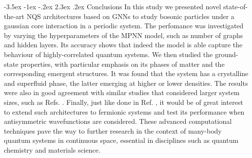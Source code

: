 \documentclass[a4paper, 12pt, oneside]{article}
\makeatletter
\renewcommand{\section}{\@startsection{section}{1}{\z@}%
             {-3.5ex \@plus-1ex \@minus-.2ex}%
             {2.3ex \@plus.2ex}%
             {\normalfont\large\bfseries}}
\makeatother
\begin{document}
\section{Conclusions}
In this study we presented novel state-of-the-art NQS architectures based on GNNs to study 
bosonic particles under a gaussian core interaction in a periodic system. The perfomance was 
investigated by varying the hyperparameters of the MPNN model, such as number of graphs and hidden 
layers. Its accuracy shows that indeed the model is able capture the behaviour of highly-correlated 
quantum systems. We then studied the ground-state properties, with particular 
emphasis on its phases of matter and the corresponding emergent structures. It was found that the system 
has a crystalline and superfluid phase, the latter emerging at higher or lower densities. 
The results were also in good agreement with similar studies that considered larger system sizes, 
such as Refs. \cite{pescia_2022, kroiss_2016}. Finally, just like done in Ref. \cite{pescia_2023}, it would be of 
great interest to extend such architectures to fermionic systems and test its performance when 
antisymmetric wavefunctions are considered. 
These advanced computational techniques pave the way to further research in the context of many-body 
quantum systems in continuous space, essential in disciplines such as quantum chemistry and 
materials science.

\printbibliography
\end{document}
